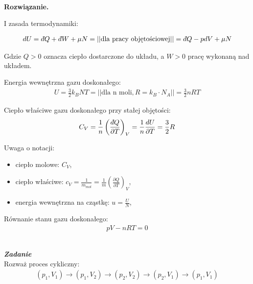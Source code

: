 \documentclass[11pt,a4paper]{article}
\newcommand{\dbar} {\ensuremath{\,\mathchar'26\mkern-12mu d}}
\newcommand{\Partial}[3]{\left( \frac{\partial #1}{\partial #2} \right)_{#3}}
\newcounter{zadanie}\newcommand{\zadanie}[1][]{\addtocounter{zadanie}{1} ~\\ {\bf \emph{Zadanie \arabic{zadanie} #1 }} \\}
\newenvironment{solution}{\vspace{1cm} \par\textbf{Rozwiązanie.} \vspace{1cm}}{}
\begin{document}
\begin{solution}
  
I zasada termodynamiki: 

\begin{align*}
  dU =   \dbar Q + \dbar W + \mu N= || \text{dla pracy objętościowej} || =
         \dbar Q - pdV + \mu N
\end{align*}

Gdzie $Q>0$ oznacza ciepło dostarczone do układu, a $W>0$ pracę wykonaną nad układem.

\vspace{0.5cm}

Energia wewnętrzna gazu doskonałego:
\begin{align*}
  U = \frac{3}{2} k_B N T = || \text{dla n moli}, R = k_B \cdot N_{A} || =
   \frac{3}{2} nR T
\end{align*}

\vspace{0.5cm}

Ciepło właściwe gazu doskonałego przy stałej objętości:
\begin{align*}
  C_V = \frac{1}{n}\left( \frac{\dbar Q}{\partial T} \right)_V = 
         \frac{1}{n} \frac{dU}{\partial T} = \frac{3}{2}R
\end{align*}

Uwaga o notacji:
\begin{itemize}
  \item ciepło molowe: $C_V$,
  \item ciepło właściwe: $c_V = \frac{1}{m_{mol}} = \frac{1}{m} \Partial{Q}{T}{V}$,
  \item energia wewnętrzna na cząstkę:  $u = \frac{U}{N}$,
\end{itemize}

\vspace{0.5cm}

Równanie stanu gazu doskonałego:
\begin{align*}
  pV - nRT = 0
\end{align*}

\newpage   
\end{solution}
\zadanie[]

Rozważ proces cykliczny:
\begin{align*}
  (p_1, V_1) \to (p_1, V_2) \to (p_2, V_2) \to (p_2, V_1) \to (p_1, V_1)
\end{align*}
\end{document}
